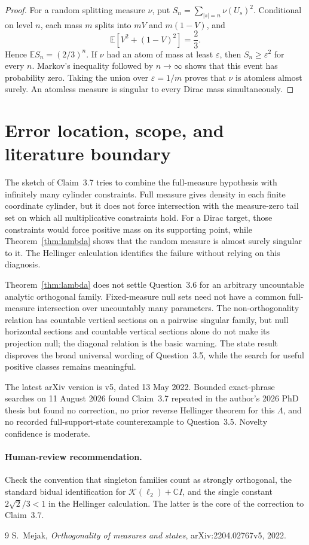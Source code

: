 \documentclass[11pt]{article}
\newcommand{\E}{\mathbb E}
\newcommand{\K}{\mathcal K}
\begin{document}
\begin{proof}
For a random splitting measure $\nu$, put
$S_n=\sum_{|s|=n}\nu(U_s)^2$.  Conditional on level $n$, each mass $m$ splits
into $mV$ and $m(1-V)$, and
\[
 \E[V^2+(1-V)^2]=\frac23.
\]
Hence $\E S_n=(2/3)^n$.  If $\nu$ had an atom of mass at least $\varepsilon$,
then $S_n\geq\varepsilon^2$ for every $n$.  Markov's inequality followed by
$n\to\infty$ shows that this event has probability zero.  Taking the union
over $\varepsilon=1/m$ proves that $\nu$ is atomless almost surely.  An
atomless measure is singular to every Dirac mass simultaneously.
\end{proof}

\section{Error location, scope, and literature boundary}

The sketch of Claim~3.7 tries to combine the full-measure hypothesis with
infinitely many cylinder constraints.  Full measure gives density in each
finite coordinate cylinder, but it does not force intersection with the
measure-zero tail set on which all multiplicative constraints hold.  For a
Dirac target, those constraints would force positive mass on its supporting
point, while Theorem~\ref{thm:lambda} shows that the random measure is almost
surely singular to it.  The Hellinger calculation identifies the failure
without relying on this diagnosis.

Theorem~\ref{thm:lambda} does not settle Question~3.6 for an arbitrary
uncountable analytic orthogonal family.  Fixed-measure null sets need not have
a common full-measure intersection over uncountably many parameters.  The
non-orthogonality relation has countable vertical sections on a pairwise
singular family, but null horizontal sections and countable vertical sections
alone do not make its projection null; the diagonal relation is the basic
warning.  The state result disproves the broad universal wording of
Question~3.5, while the search for useful positive classes remains meaningful.

The latest arXiv version is v5, dated 13 May 2022.  Bounded exact-phrase
searches on 11 August 2026 found Claim~3.7 repeated in the author's 2026 PhD
thesis but found no correction, no prior reverse Hellinger theorem for this
$\Lambda$, and no recorded full-support-state counterexample to Question~3.5.
Novelty confidence is moderate.

\paragraph{Human-review recommendation.}
Check the convention that singleton families count as strongly orthogonal,
the standard bidual identification for $\K(\ell_2)+\mathbb CI$, and the single
constant $2\sqrt2/3<1$ in the Hellinger calculation.  The latter is the core
of the correction to Claim~3.7.

\begin{thebibliography}{9}
S.~Mejak,
\emph{Orthogonality of measures and states},
arXiv:2204.02767v5, 2022.
\end{thebibliography}
\end{document}
